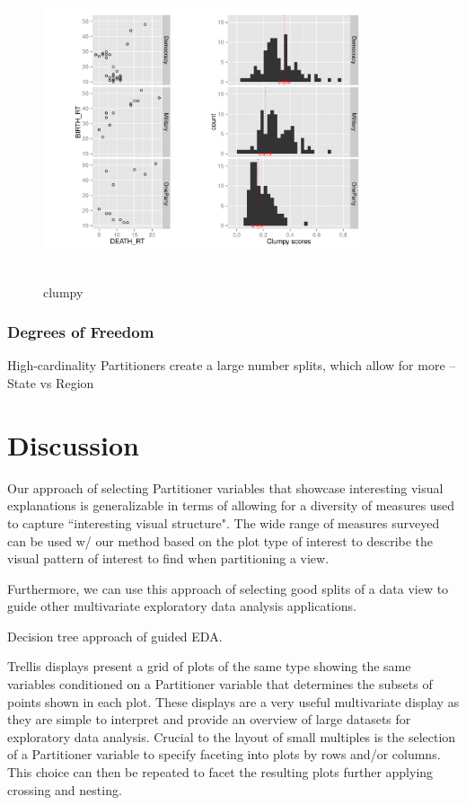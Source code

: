 \begin{figure}
\raggedleft
\includegraphics[width=3.75in,height=3.5in]{images/2_05954102971921-GOV.pdf}
  \caption{clumpy}
 \label{fig:clumpy1}
\end{figure}

\subsubsection{Degrees of Freedom}
High-cardinality Partitioners create a large number splits, which allow for more
 -- State vs Region

\section{Discussion}
\label{sec:discussion}
Our approach of selecting Partitioner variables that showcase interesting visual explanations is generalizable in terms of allowing for a diversity of measures used to capture ``interesting visual structure". The wide range of measures surveyed~\cite{Bertini2011} can be used w/ our method based on the plot type of interest to describe the visual pattern of interest to find when partitioning a view.

Furthermore, we can use this approach of selecting good splits of a data view to guide other multivariate exploratory data analysis applications.

Decision tree approach of guided EDA.

Trellis displays present a grid of plots of the same type showing the same variables conditioned on a Partitioner variable that determines the subsets of points shown in each plot. These displays are a very useful multivariate display as they are simple to interpret and provide an overview of large datasets for exploratory data analysis. Crucial to the layout of small multiples is the selection of a Partitioner variable to specify faceting into plots by rows and/or columns. This choice can then be repeated to facet the resulting plots further applying crossing and nesting.


